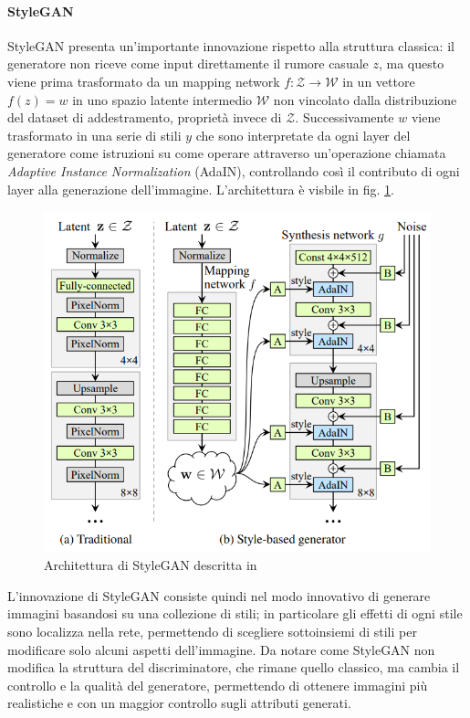 \paragraph{StyleGAN}\label{par:style}
StyleGAN \cite{karras2019style} presenta un'importante innovazione rispetto alla struttura classica: il generatore non riceve come input direttamente il rumore casuale $z$, ma questo viene prima trasformato da un mapping network $f : \mathcal{Z} \rightarrow \mathcal{W}$ in un vettore $f(z) = w$ in uno spazio latente intermedio $\mathcal{W}$ non vincolato dalla distribuzione del dataset di addestramento, proprietà invece di $\mathcal{Z}$. Successivamente $w$ viene trasformato in una serie di stili $y$ che sono interpretate da ogni layer del generatore come istruzioni su come operare attraverso un'operazione chiamata \textit{Adaptive Instance Normalization} (AdaIN), controllando così il contributo di ogni layer alla generazione dell'immagine. L'architettura è visbile in fig. \ref{fig:stylegan}.
\begin{figure}
    \centering
    \includegraphics[width=1\linewidth]{img/style-arch.png}
    \caption{Architettura di StyleGAN descritta in \cite{karras2019style}}
    \label{fig:stylegan}
\end{figure}
L'innovazione di StyleGAN consiste quindi nel modo innovativo di generare immagini basandosi su una collezione di stili; in particolare gli effetti di ogni stile sono localizza nella rete, permettendo di scegliere sottoinsiemi di stili per modificare solo alcuni aspetti dell'immagine.
Da notare come StyleGAN non modifica la struttura del discriminatore, che rimane quello classico, ma cambia il controllo e la qualità del generatore, permettendo di ottenere immagini più realistiche e con un maggior controllo sugli attributi generati.
